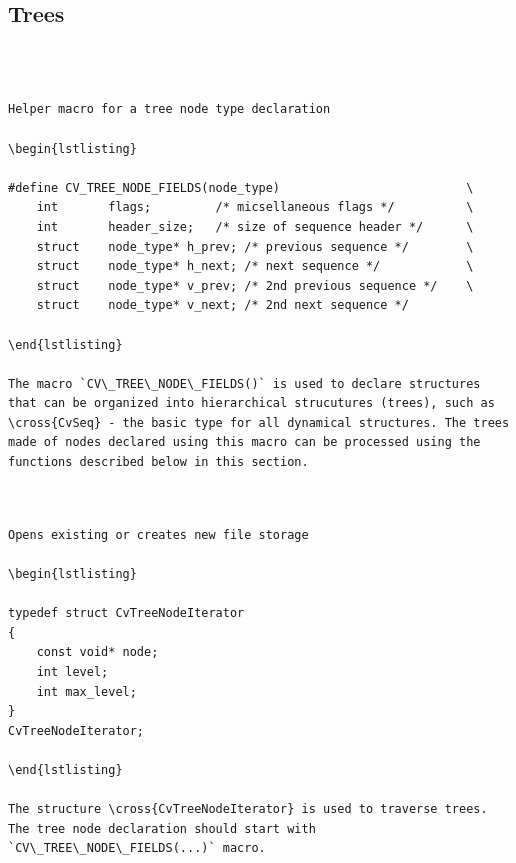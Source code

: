 \subsection{Trees}
\begin{verbatim}


\end{verbatim}
\label{CV_TREE_NODE_FIELDS}
\begin{verbatim}

Helper macro for a tree node type declaration

\begin{lstlisting}

#define CV_TREE_NODE_FIELDS(node_type)                          \
    int       flags;         /* micsellaneous flags */          \
    int       header_size;   /* size of sequence header */      \
    struct    node_type* h_prev; /* previous sequence */        \
    struct    node_type* h_next; /* next sequence */            \
    struct    node_type* v_prev; /* 2nd previous sequence */    \
    struct    node_type* v_next; /* 2nd next sequence */

\end{lstlisting}

The macro `CV\_TREE\_NODE\_FIELDS()` is used to declare structures that can be organized into hierarchical strucutures (trees), such as \cross{CvSeq} - the basic type for all dynamical structures. The trees made of nodes declared using this macro can be processed using the functions described below in this section.


\end{verbatim}
\label{CvTreeNodeIterator}
\begin{verbatim}

Opens existing or creates new file storage

\begin{lstlisting}

typedef struct CvTreeNodeIterator
{
    const void* node;
    int level;
    int max_level;
}
CvTreeNodeIterator;

\end{lstlisting}

The structure \cross{CvTreeNodeIterator} is used to traverse trees. The tree node declaration should start with `CV\_TREE\_NODE\_FIELDS(...)` macro.


\end{verbatim}
\label{InitTreeNodeIterator}
